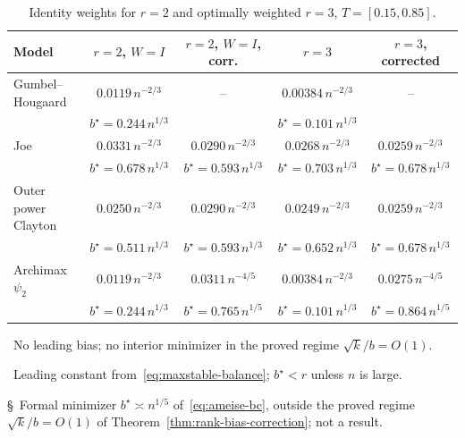 \begin{table}[t]
\centering
\small
\caption{Identity weights for $r=2$ and optimally weighted $r=3$, $T=[0.15,0.85]$.}
\label{tab:comparison-supp}
\begin{tabular}{lcccc}
\toprule
Model & $r=2$, $W=I$ & $r=2$, $W=I$, corr. & $r=3$ & $r=3$, corrected\\
\midrule
Gumbel--Hougaard & $0.0119\,n^{-2/3}$\rlap{\,\textsuperscript{\ddag}} & --\rlap{\,\textsuperscript{\dag}} & $0.00384\,n^{-2/3}$\rlap{\,\textsuperscript{\ddag}} & --\rlap{\,\textsuperscript{\dag}}\\
 & $\scriptstyle b^\star=0.244\,n^{1/3}$ &  & $\scriptstyle b^\star=0.101\,n^{1/3}$ & \\[2pt]
Joe & $0.0331\,n^{-2/3}$ & $0.0290\,n^{-2/3}$ & $0.0268\,n^{-2/3}$ & $0.0259\,n^{-2/3}$\\
 & $\scriptstyle b^\star=0.678\,n^{1/3}$ & $\scriptstyle b^\star=0.593\,n^{1/3}$ & $\scriptstyle b^\star=0.703\,n^{1/3}$ & $\scriptstyle b^\star=0.678\,n^{1/3}$\\[2pt]
Outer power Clayton & $0.0250\,n^{-2/3}$ & $0.0290\,n^{-2/3}$ & $0.0249\,n^{-2/3}$ & $0.0259\,n^{-2/3}$\\
 & $\scriptstyle b^\star=0.511\,n^{1/3}$ & $\scriptstyle b^\star=0.593\,n^{1/3}$ & $\scriptstyle b^\star=0.652\,n^{1/3}$ & $\scriptstyle b^\star=0.678\,n^{1/3}$\\[2pt]
Archimax $\psi_2$ & $0.0119\,n^{-2/3}$\rlap{\,\textsuperscript{\ddag}} & $0.0311\,n^{-4/5}$\rlap{\,\textsuperscript{\S}} & $0.00384\,n^{-2/3}$\rlap{\,\textsuperscript{\ddag}} & $0.0275\,n^{-4/5}$\rlap{\,\textsuperscript{\S}}\\
 & $\scriptstyle b^\star=0.244\,n^{1/3}$ & $\scriptstyle b^\star=0.765\,n^{1/5}$ & $\scriptstyle b^\star=0.101\,n^{1/3}$ & $\scriptstyle b^\star=0.864\,n^{1/5}$\\[2pt]
\bottomrule
\end{tabular}

\smallskip
{\footnotesize
\dag~No leading bias; no interior minimizer in the proved regime $\sqrt{k}/b=O(1)$.\par
\ddag~Leading constant from~\eqref{eq:maxstable-balance}; $b^\star<r$ unless $n$ is large.\par
\S~Formal minimizer $b^\star\asymp n^{1/5}$ of~\eqref{eq:ameise-bc}, outside the
proved regime $\sqrt{k}/b=O(1)$ of Theorem~\ref{thm:rank-bias-correction}; not a result.}
\end{table}
